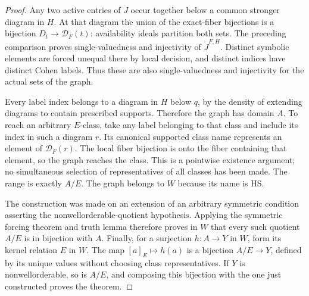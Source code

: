 \begin{proof}
Any two active entries of $\dot J$ occur together below a common
stronger diagram in $H$. At that diagram the union of the
exact-fiber bijections is a bijection
$D_t\to\mathcal D_F(t)$: availability ideals partition both sets.
The preceding comparison proves single-valuedness and injectivity of
$\dot J^{F,H}$. Distinct symbolic elements are forced unequal there
by local decision, and distinct indices have distinct Cohen labels.
Thus these are also single-valuedness and injectivity for the actual
sets of the graph.

Every label index belongs to a diagram in $H$ below $q$, by the
density of extending diagrams to contain prescribed supports.
Therefore the graph has domain $A$. To reach an arbitrary $E$-class,
take any label belonging to that class and include its index in such
a diagram $r$. Its canonical supported class name represents an
element of $\mathcal D_F(r)$. The local fiber bijection is onto the
fiber containing that element, so the graph reaches the class.
This is a pointwise existence argument; no simultaneous selection
of representatives of all classes has been made. The range is
exactly $A/E$. The graph belongs to $W$ because its name is HS.

The construction was made on an extension of an arbitrary symmetric
condition asserting the nonwellorderable-quotient hypothesis. Applying
the symmetric forcing theorem and truth lemma therefore proves in
$W$ that every such quotient $A/E$ is in bijection with $A$.
Finally, for a surjection $h:A\to Y$ in $W$, form its kernel
relation $E$ in $W$. The map $[a]_E\mapsto h(a)$ is a bijection
$A/E\to Y$, defined by its unique values without choosing class
representatives. If $Y$ is nonwellorderable, so is $A/E$, and composing
this bijection with the one just constructed proves the theorem.
\end{proof}
